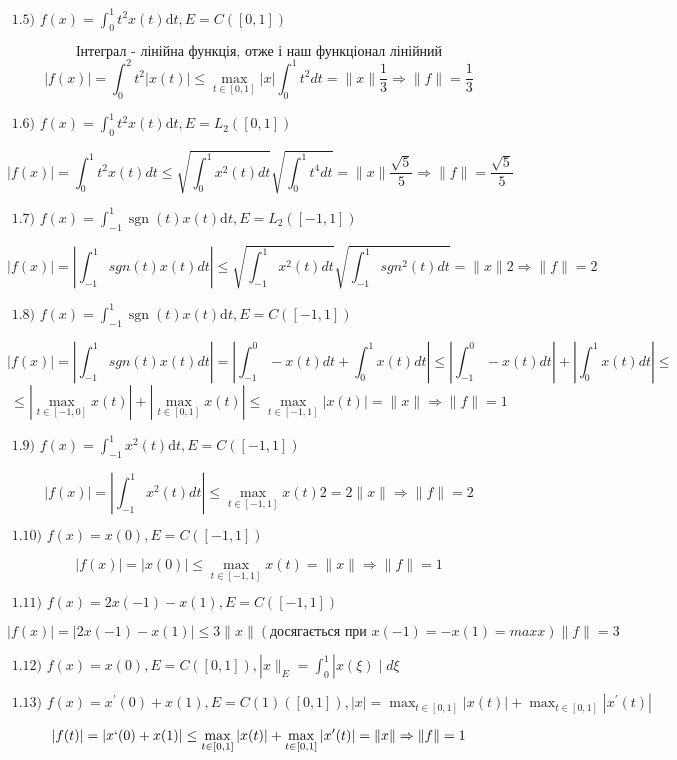 \begin{tcolorbox}
    $
    \text { 1.5) } f(x)=\int_{0}^{1} t^{2} x(t) \mathrm{d} t, E=C([0,1]) 
    $

    $$ \text{Інтеграл - лінійна функція, отже і наш функціонал лінійний} $$
    $$ |f(x)| = \int_0^2 t^2 |x(t)| \le \max_{t \in[0,1]}|x|\int_{0}^{1}t^2dt = 
    \|x\| \frac{1}{3} \Rightarrow \|f\| = \frac{1}{3}$$

    $
    \text { 1.6) } f(x)=\int_{0}^{1} t^{2} x(t) \mathrm{d} t, E=L_{2}([0,1]) 
    $

    $$ |f(x)| = \int_0^1t^2x(t)dt \le 
    \sqrt{\int_0^1x^2(t)dt} \sqrt{\int_0^1t^4dt} = 
    \|x\|\frac{\sqrt{5}}{5} \Rightarrow \|f\|=\frac{\sqrt{5}}{5}$$

    $
    \text { 1.7) } f(x)=\int_{-1}^{1} \operatorname{sgn}(t) x(t) \mathrm{d} t, E=L_{2}([-1,1]) 
    $

    $$ |f(x)| = |\int_{-1}^1sgn(t)x(t)dt| \le 
    \sqrt{\int_{-1}^1x^2(t)dt} \sqrt{\int_{-1}^{1}sgn^2(t)dt} = 
    \|x\| 2 \Rightarrow \|f\| = 2 $$

    $
    \text { 1.8) } f(x)=\int_{-1}^{1} \operatorname{sgn}(t) x(t) \mathrm{d} t, E=C([-1,1]) 
    $
    
    $$ |f(x)| = |\int_{-1}^1sgn(t)x(t)dt| = 
    | \int_{-1}^{0}-x(t)dt + \int_{0}^1x(t)dt | \le 
    | \int_{-1}^{0}-x(t)dt| + | \int_{0}^1x(t)dt | \le $$ 
    $$
    \le | \max_{t\in[-1,0]}x(t)| + |\max_{t\in[0, 1]}x(t)| \le 
    \max_{t\in[-1, 1]}|x(t)| = \|x\| \Rightarrow \|f\| = 1$$


    $
    \text { 1.9) } f(x)=\int_{-1}^{1}x^{2}(t) \mathrm{d} t, E=C([-1,1]) 
    $

    $$ |f(x)| =|\int_{-1}^{1}x^{2}(t)dt| \le 
    \max_{t \in [-1, 1]} x(t) 2 = 2\|x\| \Rightarrow \|f\| = 2  $$

    $
    \text { 1.10) } f(x)=x(0), E=C([-1,1]) 
    $

    $$|f(x)| = |x(0)| \le \max_{t\in[-1, 1]}x(t) = \|x\| \Rightarrow \|f\| = 1$$

    $
    \text { 1.11) } f(x)=2 x(-1)-x(1), E=C([-1,1]) 
    $

    $$ |f(x)| = |2x(-1) - x(1)| \le 3\|x\| (\text{досягається при } x(-1) = -x(1) = max x) 
    \|f\| = 3 $$

    $
    \text { 1.12) } f(x)=x(0), E=C([0,1]),|x \|_{E}=\int_{0}^{1}| x(\xi) \mid d \xi 
    $

    $
    \text { 1.13) } f(x)=x^{\prime}(0)+x(1), E=C(1)([0,1]),|x|=\max _{t \in[0,1]}|x(t)|+\max _{t \in[0,1]}|x^{\prime}(t)|
    $

    $$|f(t)| = |x`(0) + x(1)| \le \max _{t \in[0,1]}|x(t)|+\max _{t \in[0,1]}|x^{\prime}(t)|=
    \|x\| \Rightarrow \|f\| = 1 $$


\end{tcolorbox}

